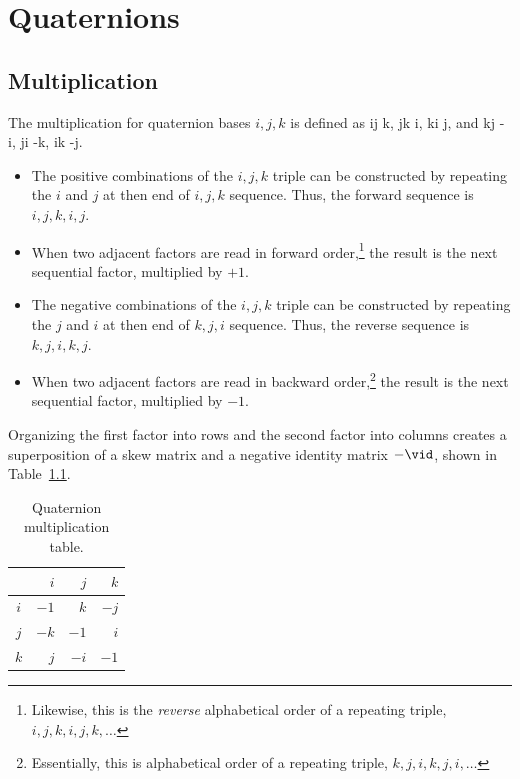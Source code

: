 \chapter{Quaternions}

\section{Multiplication}

The multiplication for quaternion bases $i, j, k$ is defined as 
\be
i\;j  k, \;\;\; j\;k  i, \;\;\;  k\;i  j, \;\;\; 
\mbox{and} \;\;\;
 k\;j  -i, \;\;\; j\;i  -k, \;\;\; i\;k  -j.
\ee 

\begin{itemize}
\item The positive combinations of the $i, j, k$ triple can be 
constructed by repeating the $i$ and $j$ at then end of
$i, j, k$ sequence.  Thus, the forward sequence is 
$i, j, k, i, j$.  

\item When two adjacent factors are read
in forward order,\footnote{Likewise, this is the {\em reverse}
alphabetical
order of a repeating triple, $i, j, k, i, j, k, \ldots$} the
result is the next sequential factor, multiplied by $+1$.

\item The negative combinations of the $i, j, k$ triple can be 
constructed by repeating the $j$ and $i$ at then end of
$k, j, i$ sequence.  Thus, the reverse sequence is 
$k, j, i, k, j$.  

\item When two adjacent factors are read
in backward order,\footnote{Essentially, this is alphabetical
order of a repeating triple, $k, j, i, k, j, i, \ldots$} the
result is the next sequential factor, multiplied by $-1$.
\end{itemize}

Organizing the first factor into rows and the second 
factor into columns creates a superposition of a skew matrix
and a negative identity matrix $-\vid$, shown in 
Table~\ref{tab:quat_table}.

\begin{table}[htb]
\label{tab:quat_table}
\caption{Quaternion multiplication table.}
\centering
\begin{tabular}{c||r|r|r|}
    & $i$ & $j$ & $k$ \\ \hline \hline
$i$ & $-1$  & $k$ & $-j$ \\ \hline
$j$ & $-k$ & $-1$ & $i$ \\ \hline
$k$ & $j$ &  $-i$ & $-1$ \\ \hline
\end{tabular}
\end{table}

